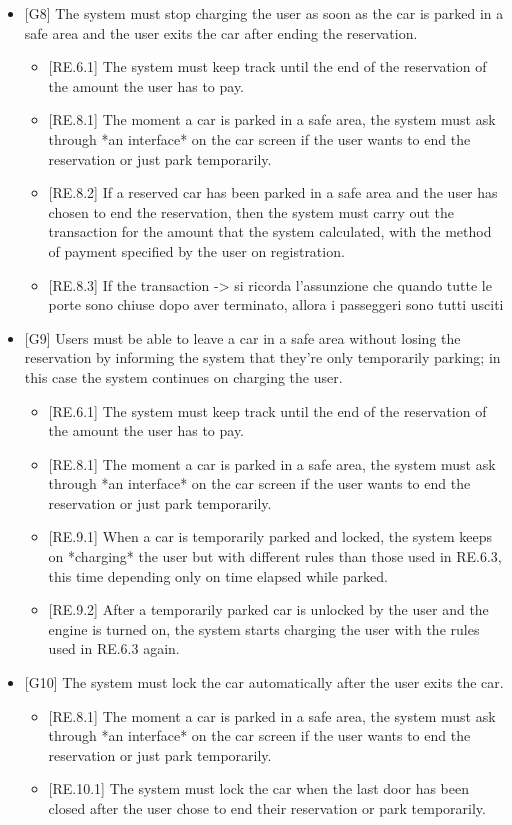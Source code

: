 \documentclass[english]{article}
\begin{document}
\begin{itemize}
\item{[G8] The system must stop charging the user as soon as the car is parked in a safe area and the user exits the car after ending the reservation.
\begin{itemize}
	\item{[RE.6.1] The system must keep track until the end of the reservation of the amount the user has to pay.}
	\item{[RE.8.1] The moment a car is parked in a safe area, the system must ask through *an interface* on the car screen if the user wants to end the reservation or just park temporarily.}
	\item{[RE.8.2] If a reserved car has been parked in a safe area and the user has chosen to end the reservation, then  the system must carry out the transaction for the amount that the system calculated, with the method of payment specified by the user on registration.}
	\item{[RE.8.3] If the transaction}
-> si ricorda l’assunzione che quando tutte le porte sono chiuse dopo aver terminato, allora i passeggeri sono tutti usciti
\end{itemize}
}

\item{[G9] Users must be able to leave a car in a safe area without losing the reservation by informing the system that they’re only temporarily parking; in this case the system continues on charging the user.
\begin{itemize}
	\item{[RE.6.1] The system must keep track until the end of the reservation of the amount the user has to pay.}
	\item{[RE.8.1] The moment a car is parked in a safe area, the system must ask through *an interface* on the car screen if the user wants to end the reservation or just park temporarily.}
	\item{[RE.9.1] When a car is temporarily parked and locked, the system keeps on *charging* the user but with different rules than those used in RE.6.3, this time depending only on time elapsed while parked.}
	\item{[RE.9.2] After a temporarily parked car is unlocked by the user and the engine is turned on, the system starts charging the user with the rules used in RE.6.3 again.}
\end{itemize}
}

\item{[G10] The system must lock the car automatically after the user exits the car.
\begin{itemize}
	\item{[RE.8.1] The moment a car is parked in a safe area, the system must ask through *an interface* on the car screen if the user wants to end the reservation or just park temporarily.}
	\item{[RE.10.1] The system must lock the car when the last door has been closed after the user chose to end their reservation or park temporarily.}
\end{itemize}
}


\end{itemize}
\end{document}
